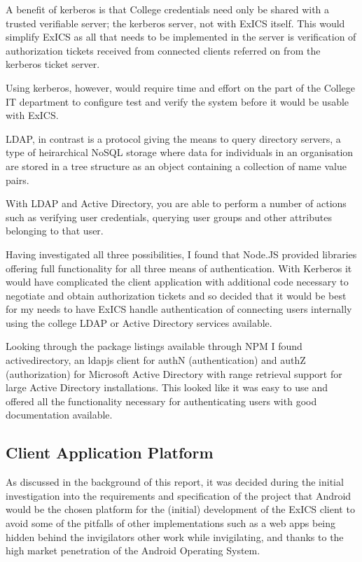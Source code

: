 A benefit of kerberos is that College credentials need only be shared with a trusted verifiable server; the kerberos server, not with ExICS itself.  This would simplify ExICS as all that needs to be implemented in the server is verification of authorization tickets received from connected clients referred on from the kerberos ticket server.

Using kerberos, however, would require time and effort on the part of the College IT department to configure test and verify the system before it would be usable with ExICS.

LDAP, in contrast is a protocol giving the means to query directory servers, a type of heirarchical NoSQL storage where data for individuals in an organisation are stored in a tree structure as an object containing a collection of name value pairs.

With LDAP and Active Directory, you are able to perform a number of actions such as verifying user credentials, querying user groups and other attributes belonging to that user.

Having investigated all three possibilities, I found that Node.JS provided libraries offering full functionality for all three means of authentication.  With Kerberos it would have complicated the client application with additional code necessary to negotiate and obtain authorization tickets and so decided that it would be best for my needs to have ExICS handle authentication of connecting users internally using the college LDAP or Active Directory services available.

Looking through the package listings available through NPM I found activedirectory, an ldapjs client for authN (authentication) and authZ (authorization) for Microsoft Active Directory with range retrieval support for large Active Directory installations.\cite{activedirectory}  This looked like it was easy to use and offered all the functionality necessary for authenticating users with good documentation available.

\subsection{Client Application Platform}
\label{subs:exics_client_platform}

As discussed in the background of this report, it was decided during the initial investigation into the requirements and specification of the project that Android would be the chosen platform for the (initial) development of the ExICS client to avoid some of the pitfalls of other implementations such as a web apps being hidden behind the invigilators other work while invigilating, and thanks to the high market penetration of the Android Operating System.

